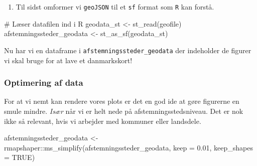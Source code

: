 \documentclass[
  a4paper,
  DIV=11,
  numbers=noendperiod,
  oneside]{scrartcl}
\newenvironment{Shaded}{\begin{snugshade}}{\end{snugshade}}
\newcommand{\AttributeTok}[1]{\textcolor[rgb]{0.40,0.45,0.13}{#1}}
\newcommand{\CommentTok}[1]{\textcolor[rgb]{0.37,0.37,0.37}{#1}}
\newcommand{\ConstantTok}[1]{\textcolor[rgb]{0.56,0.35,0.01}{#1}}
\newcommand{\FloatTok}[1]{\textcolor[rgb]{0.68,0.00,0.00}{#1}}
\newcommand{\FunctionTok}[1]{\textcolor[rgb]{0.28,0.35,0.67}{#1}}
\newcommand{\NormalTok}[1]{\textcolor[rgb]{0.00,0.23,0.31}{#1}}
\newcommand{\OtherTok}[1]{\textcolor[rgb]{0.00,0.23,0.31}{#1}}
\newcommand{\SpecialCharTok}[1]{\textcolor[rgb]{0.37,0.37,0.37}{#1}}
\providecommand{\tightlist}{%
  \setlength{\itemsep}{0pt}\setlength{\parskip}{0pt}}\usepackage{longtable,booktabs,array}
\begin{document}
\begin{enumerate}
\def\labelenumi{\arabic{enumi}.}
\setcounter{enumi}{2}
\tightlist
\item
  Til sidst omformer vi \texttt{geoJSON} til et \texttt{sf} format som
  \texttt{R} kan forstå.
\end{enumerate}

\begin{Shaded}
\begin{Highlighting}[]
\CommentTok{\# Læser datafilen ind i R}
\NormalTok{geodata\_st }\OtherTok{\textless{}{-}} \FunctionTok{st\_read}\NormalTok{(geofile)}
\NormalTok{afstemningssteder\_geodata }\OtherTok{\textless{}{-}} \FunctionTok{st\_as\_sf}\NormalTok{(geodata\_st)}
\end{Highlighting}
\end{Shaded}


Nu har vi en dataframe i \texttt{afstemningssteder\_geodata} der
indeholder de figurer vi skal bruge for at lave et danmarkskort!

\subsubsection{Optimering af data}\label{optimering-af-data}

For at vi nemt kan rendere vores plots er det en god ide at gøre
figurerne en smule mindre. \emph{Især} når vi er helt nede på
afstemningsstedsniveau. Det er nok ikke så relevant, hvis vi arbejder
med kommuner eller landsdele.

\begin{Shaded}
\begin{Highlighting}[]
\NormalTok{afstemningssteder\_geodata }\OtherTok{\textless{}{-}}\NormalTok{ rmapshaper}\SpecialCharTok{::}\FunctionTok{ms\_simplify}\NormalTok{(afstemningssteder\_geodata,}
                                                     \AttributeTok{keep =} \FloatTok{0.01}\NormalTok{, }\AttributeTok{keep\_shapes =} \ConstantTok{TRUE}\NormalTok{)}
\end{Highlighting}
\end{Shaded}

\end{document}

